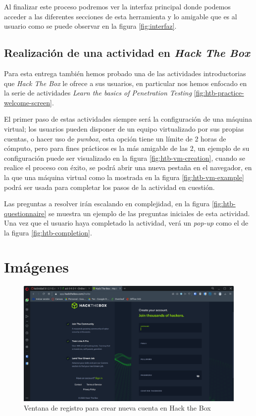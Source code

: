 \documentclass{article}
\begin{document}
            Al finalizar este proceso podremos ver la interfaz principal donde podemos acceder a las diferentes secciones de esta herramienta y lo amigable que es al usuario como se puede observar en la figura \ref{fig:interfaz}.

        \subsection{Realización de una actividad en \emph{Hack The Box}}

            Para esta entrega también hemos probado una de las actividades introductorias que \emph{Hack The Box} le ofrece a sus usuarios, en particular nos hemos enfocado en la serie de actividades \emph{Learn the basics of Penetration Testing} \ref{fig:htb-practice-welcome-screen}.

            El primer paso de estas actividades siempre será la configuración de una máquina virtual; los usuarios pueden disponer de un equipo virtualizado por sus propias cuentas, o hacer uso de \emph{pwnbox}, esta opción tiene un límite de 2 horas de cómputo, pero para fines prácticos es la más amigable de las 2, un ejemplo de su configuración puede ser visualizado en la figura \ref{fig:htb-vm-creation}, cuando se realice el proceso con éxito, se podrá abrir una nueva pestaña en el navegador, en la que una máquina virtual como la mostrada en la figura \ref{fig:htb-vm-example} podrá ser usada para completar los pasos de la actividad en cuestión.

            Las preguntas a resolver irán escalando en complejidad, en la figura \ref{fig:htb-questionnaire} se muestra un ejemplo de las preguntas iniciales de esta actividad. Una vez que el usuario haya completado la actividad, verá un \emph{pop-up} como el de la figura \ref{fig:htb-completion}.

    \clearpage
    \section{Imágenes}

        \begin{figure}[!htbp]
            \centering
            \includegraphics[scale=0.25]{img/htb-register.png}
            \caption{Ventana de registro para crear nueva cuenta en Hack the Box}
            \label{fig:registro}
        \end{figure}
\end{document}
